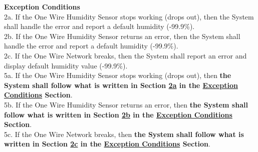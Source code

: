 \documentclass[letterpaper]{article}
\begin{document}
\textbf{Exception Conditions}\\
2a.  If the One Wire Humidity Sensor stops working (drops out), then
the System shall handle the error and report a default humidity
(-99.9\%).\\
2b.  If the One Wire Humidity Sensor returns an error, then the
System shall handle the error and report a default humidity
(-99.9\%).\\
2c.  If the One Wire Network breaks, then the System shall report an
error and display default humidity value (-99.9\%).\\
5a.  If the One Wire Humidity Sensor stops working (drops out), then
\textbf{the System shall follow what is written in Section
\underline{2a} in the \underline{Exception Conditions} Section}.\\
5b.  If the One Wire Humidity Sensor returns an error, then
\textbf{the System shall follow what is written in Section
\underline{2b} in the \underline{Exception Conditions} Section}.\\
5c.  If the One Wire Network breaks, then \textbf{the System shall
follow what is written in Section \underline{2c} in the 
\underline{Exception Conditions} Section}.
\end{document}
